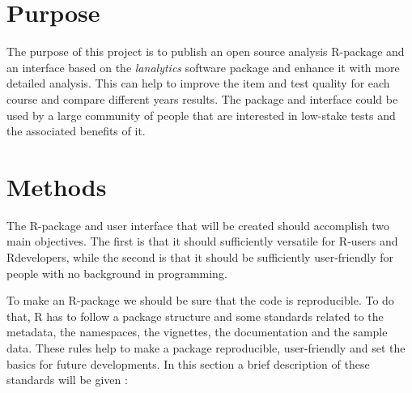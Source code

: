 \documentclass{article}
\begin{document}

\section*{Purpose} 


The purpose of this project is to publish an open source analysis \textsf{R}-package and an interface based on the \textit{lanalytics} software package and enhance it with more detailed analysis. This can help to improve the item and test quality for each course and compare different years results. The package and interface could be used by a large community of people that are interested in low-stake tests and the associated benefits of it.


\section*{Methods}

The \textsf{R}-package and user interface that will be created should accomplish two main objectives. The first is that it should sufficiently versatile for \textsf{R}-users and \textsf{R}developers, while the second is that it should be sufficiently user-friendly for people with no background in programming. 

To make an \textsf{R}-package we should be sure that the code is reproducible. To do that, R has to follow a package structure and some standards related to the metadata, the namespaces, the vignettes, the documentation and the sample data. These rules help to make a package reproducible, user-friendly and set the basics for future developments. In this section a brief description of these standards will be given \cite{wickham2015r}:
\end{document}
